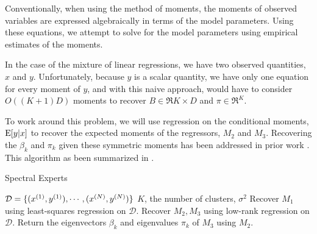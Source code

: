 Conventionally, when using the method of moments, the moments of
observed variables are expressed algebraically in terms of the model
parameters. Using these equations, we attempt to solve for the model
parameters using empirical estimates of the moments. 

In the case of the mixture of linear regressions, we have two observed
quantities, $x$ and $y$. Unfortunately, because $y$ is a scalar
quantity, we have only one equation for every moment of $y$, and with
this naive approach, would have to consider $O( (K+1) D)$ moments to
recover $B \in \Re{K \times D}$ and $\pi \in \Re^K$. 

% 

To work around this problem, we will use regression on the conditional
moments, $\operatorname{E}[y | x]$ to recover the expected moments of the regressors,
$M_2$ and $M_3$. Recovering the $\beta_k$ and $\pi_k$ given these
symmetric moments has been addressed in prior work
\citep{AnandkumarHsuKakade2012, AnandkumarGeHsu2012}.  This algorithm as
been summarized in .

\begin{algorithm}[t]
  \caption{Spectral Experts}
  \label{algo:spectral-experts}
  \begin{algorithmic}[1]
    \REQUIRE $\mathcal{D} = \{ (x^{(1)}, y^{(1)}), \cdots, (x^{(N)}, y^{(N)}) \}$
    \REQUIRE $K$, the number of clusters, $\sigma^2$ 
    \STATE Recover $M_1$ using least-squares regression on $\mathcal{D}$.
    \STATE Recover $M_2, M_3$ using low-rank regression on $\mathcal{D}$.
    \STATE Return the eigenvectors $\beta_k$ and eigenvalues $\pi_k$ of $M_3$ using $M_2$.
  \end{algorithmic}
\end{algorithm}

